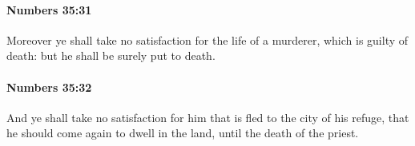 		\paragraph{Numbers 35:31} %
			\label{NUMBERS-35-31}

			Moreover ye shall take no satisfaction for the life of a murderer, which is guilty of death: but he shall be surely put to death.


		\paragraph{Numbers 35:32} %
			\label{NUMBERS-35-32}

			And ye shall take no satisfaction for him that is fled to the city of his refuge, that he should come again to dwell in the land, until the death of the priest.


